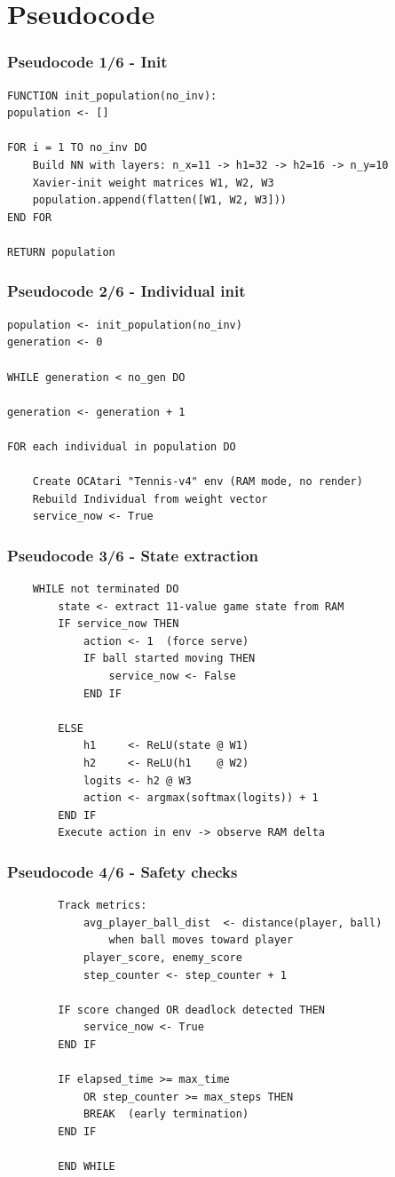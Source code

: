 \documentclass{beamer}
\begin{document}
	\section{Pseudocode}
	\begin{frame}[fragile]
		\frametitle{Pseudocode 1/6 - Init}
		\begin{verbatim}
FUNCTION init_population(no_inv):
population <- []

FOR i = 1 TO no_inv DO
	Build NN with layers: n_x=11 -> h1=32 -> h2=16 -> n_y=10
	Xavier-init weight matrices W1, W2, W3
	population.append(flatten([W1, W2, W3]))
END FOR

RETURN population
		\end{verbatim}
	\end{frame}
	\begin{frame}[fragile]
		\frametitle{Pseudocode 2/6 - Individual init}
		\begin{verbatim}
population <- init_population(no_inv)
generation <- 0

WHILE generation < no_gen DO

generation <- generation + 1

FOR each individual in population DO

	Create OCAtari "Tennis-v4" env (RAM mode, no render)
	Rebuild Individual from weight vector
	service_now <- True
		\end{verbatim}
	\end{frame}
	\begin{frame}[fragile]
		\frametitle{Pseudocode 3/6 - State extraction}
		\begin{verbatim}
	WHILE not terminated DO
		state <- extract 11-value game state from RAM
		IF service_now THEN
			action <- 1  (force serve)
			IF ball started moving THEN 
				service_now <- False
			END IF

		ELSE
			h1     <- ReLU(state @ W1)
			h2     <- ReLU(h1    @ W2)
			logits <- h2 @ W3
			action <- argmax(softmax(logits)) + 1
		END IF
		Execute action in env -> observe RAM delta
		\end{verbatim}
	\end{frame}
	\begin{frame}[fragile]
		\frametitle{Pseudocode 4/6 - Safety checks}
		\begin{verbatim}
		Track metrics:
			avg_player_ball_dist  <- distance(player, ball)
				when ball moves toward player
			player_score, enemy_score
			step_counter <- step_counter + 1

		IF score changed OR deadlock detected THEN
			service_now <- True
		END IF

		IF elapsed_time >= max_time 
			OR step_counter >= max_steps THEN
			BREAK  (early termination)
		END IF

		END WHILE
		\end{verbatim}
	\end{frame}
\end{document}
